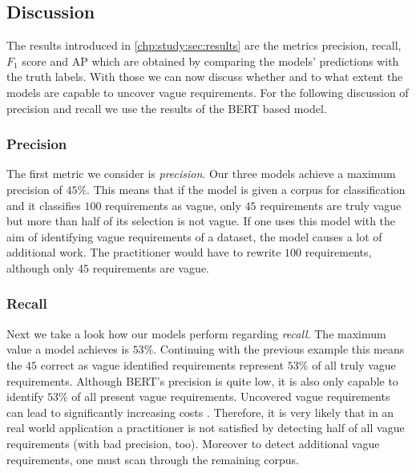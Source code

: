 \subsection{Discussion}
\label{chp:study:sec:interpretation:subsec:discussion}

The results introduced in \cref{chp:study:sec:results} are the metrics precision, recall, $F_1$ score and \ac{AP} which are obtained by comparing the models' predictions with the truth labels.
With those we can now discuss whether and to what extent the models are capable to uncover vague requirements.
For the following discussion of precision and recall we use the results of the \ac{BERT} based model.

\subsubsection{Precision}
\label{chp:study:sec:interpretation:subsec:discussion:precision}
The first metric we consider is \textit{precision}.
Our three models achieve a maximum precision of $45\%$.
This means that if the model is given a corpus for classification and it classifies $100$ requirements as vague, only $45$ requirements are truly vague but more than half of its selection is not vague.
If one uses this model with the aim of identifying vague requirements of a dataset, the model causes a lot of additional work.
The practitioner would have to rewrite $100$ requirements, although only $45$ requirements are vague.

\subsubsection{Recall}
\label{chp:study:sec:interpretation:subsec:discussion:recall}
Next we take a look how our models perform regarding \textit{recall}.
The maximum value a model achieves is $53\%$.
Continuing with the previous example this means the $45$ correct as vague identified requirements represent $53\%$ of all truly vague requirements.
Although \ac{BERT}'s precision is quite low, it is also only capable to identify $53\%$ of all present vague requirements.
Uncovered vague requirements can lead to significantly increasing costs \parencite{Femmer:2017}.
Therefore, it is very likely that in an real world application a practitioner is not satisfied by detecting half of all vague requirements (with bad precision, too).
Moreover to detect additional vague requirements, one must scan through the remaining corpus.


